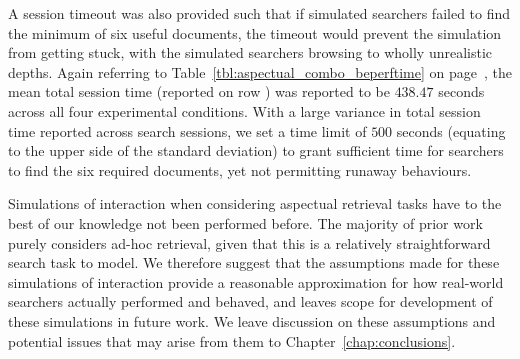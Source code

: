 A session timeout was also provided such that if simulated searchers failed to find the minimum of six useful documents, the timeout would prevent the simulation from getting stuck, with the simulated searchers browsing to wholly unrealistic depths. Again referring to Table~\ref{tbl:aspectual_combo_beperftime} on page~\pageref{tbl:aspectual_combo_beperftime}, the mean total session time (reported on row ) was reported to be $438.47$ seconds across all four experimental conditions. With a large variance in total session time reported across search sessions, we set a time limit of $500$ seconds (equating to the upper side of the standard deviation) to grant sufficient time for searchers to find the six required documents, yet not permitting runaway behaviours.

Simulations of interaction when considering aspectual retrieval tasks have to the best of our knowledge not been performed before. The majority of prior work purely considers ad-hoc retrieval, given that this is a relatively straightforward search task to model. We therefore suggest that the assumptions made for these simulations of interaction provide a reasonable approximation for how real-world searchers actually performed and behaved, and leaves scope for development of these simulations in future work. We leave discussion on these assumptions and potential issues that may arise from them to Chapter~\ref{chap:conclusions}.

